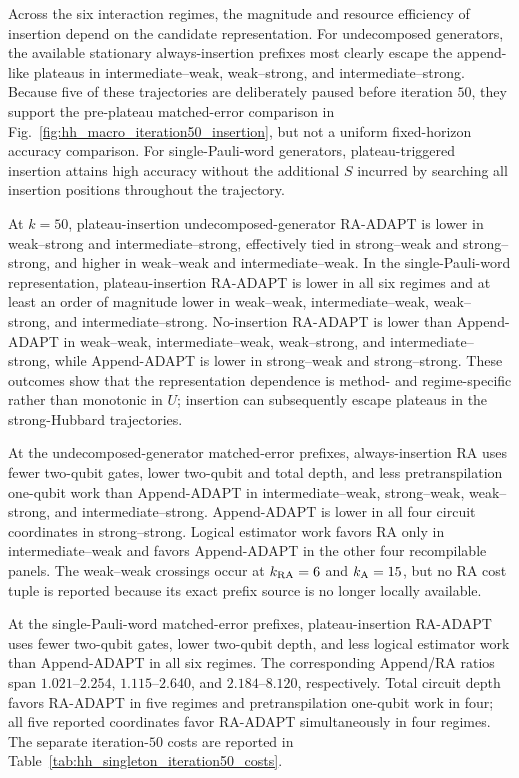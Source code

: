 \documentclass[
  reprint,
  amsmath,
  amssymb,
  aps,
  pra,
  nofootinbib,
  superscriptaddress,
  floatfix
]{revtex4-2}
\begin{document}
\clearpage
\twocolumngrid
\par\addvspace{0.45ex}
Across the six interaction regimes, the magnitude and resource efficiency of
insertion depend on the candidate representation. For undecomposed generators,
the available stationary always-insertion prefixes most clearly escape the
append-like plateaus in intermediate--weak, weak--strong, and
intermediate--strong. Because five of these trajectories are deliberately
paused before iteration \(50\), they support the pre-plateau matched-error
comparison in Fig.~\ref{fig:hh_macro_iteration50_insertion}, but not a uniform
fixed-horizon accuracy comparison. For single-Pauli-word generators,
plateau-triggered insertion attains high accuracy without the additional \(S\)
incurred by searching all insertion positions throughout the trajectory.

At \(k=50\), plateau-insertion undecomposed-generator RA-ADAPT is lower in
weak--strong and intermediate--strong, effectively tied in strong--weak and
strong--strong, and higher in weak--weak and intermediate--weak. In the
single-Pauli-word representation, plateau-insertion RA-ADAPT is lower in all
six regimes and at least an order of magnitude lower in weak--weak,
intermediate--weak, weak--strong, and intermediate--strong. No-insertion
RA-ADAPT is lower than Append-ADAPT in
weak--weak, intermediate--weak, weak--strong, and intermediate--strong, while
Append-ADAPT is lower in strong--weak and strong--strong. These outcomes show
that the representation dependence is method- and regime-specific rather than
monotonic in \(U\); insertion can subsequently escape plateaus in the
strong-Hubbard trajectories.

At the undecomposed-generator matched-error prefixes, always-insertion RA uses
fewer two-qubit gates, lower two-qubit and total depth, and less
pretranspilation one-qubit work than Append-ADAPT in intermediate--weak,
strong--weak, weak--strong, and intermediate--strong. Append-ADAPT is lower in
all four circuit coordinates in strong--strong. Logical estimator work favors
RA only in intermediate--weak and favors Append-ADAPT in the other four
recompilable panels. The weak--weak crossings occur at \(k_{\rm RA}=6\) and
\(k_{\rm A}=15\), but no RA cost tuple is reported because its exact prefix
source is no longer locally available.

At the single-Pauli-word matched-error prefixes, plateau-insertion RA-ADAPT
uses fewer two-qubit gates, lower two-qubit depth, and less logical estimator
work than Append-ADAPT in all six regimes. The corresponding Append/RA ratios
span \(1.021\)--\(2.254\), \(1.115\)--\(2.640\), and
\(2.184\)--\(8.120\), respectively. Total circuit depth favors RA-ADAPT in
five regimes and pretranspilation one-qubit work in four; all five reported
coordinates favor RA-ADAPT simultaneously in four regimes. The separate
iteration-\(50\) costs are reported in
Table~\ref{tab:hh_singleton_iteration50_costs}.
\par\addvspace{1.0ex}
\end{document}
